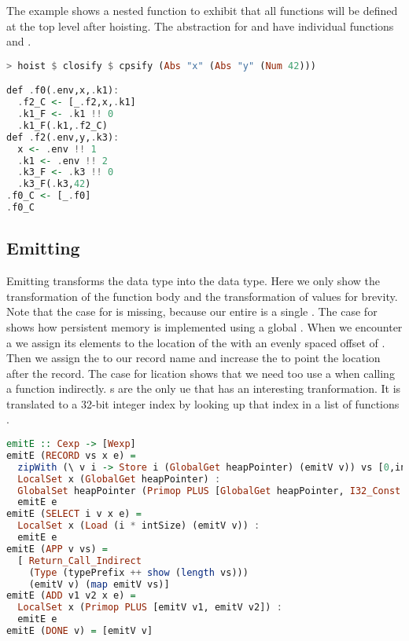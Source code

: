 {The example shows a nested function to exhibit that all functions will be defined at the top level after hoisting. The abstraction for  and  have individual functions  and .

\begin{lstlisting}[language=Haskell]
> hoist $ closify $ cpsify (Abs "x" (Abs "y" (Num 42)))

def .f0(.env,x,.k1):
  .f2_C <- [_.f2,x,.k1]
  .k1_F <- .k1 !! 0
  .k1_F(.k1,.f2_C)
def .f2(.env,y,.k3):
  x <- .env !! 1
  .k1 <- .env !! 2
  .k3_F <- .k3 !! 0
  .k3_F(.k3,42)
.f0_C <- [_.f0]
.f0_C
\end{lstlisting}

\subsection{\label{section:emit}Emitting}
Emitting transforms the  data type into the  data type. Here we only show the transformation of the function body  and the transformation of values  for brevity. Note that the case for  is missing, because our entire  is a single . The case for  shows how persistent memory is implemented using a global . When we encounter a  we assign its elements  to the location of the  with an evenly spaced offset of . Then we assign the  to our record name and increase the  to point the location after the record. The case for lication shows that we need too use a  when calling a function indirectly. s are the only ue that has an interesting tranformation. It is translated to a 32-bit integer index by looking up that index in a list of functions .

\begin{lstlisting}[language=Haskell]
emitE :: Cexp -> [Wexp]
emitE (RECORD vs x e) =
  zipWith (\ v i -> Store i (GlobalGet heapPointer) (emitV v)) vs [0,intSize..] ++
  LocalSet x (GlobalGet heapPointer) :
  GlobalSet heapPointer (Primop PLUS [GlobalGet heapPointer, I32_Const (length vs * intSize)]) :
  emitE e
emitE (SELECT i v x e) =
  LocalSet x (Load (i * intSize) (emitV v)) :
  emitE e
emitE (APP v vs) =
  [ Return_Call_Indirect
    (Type (typePrefix ++ show (length vs)))
    (emitV v) (map emitV vs)]
emitE (ADD v1 v2 x e) =
  LocalSet x (Primop PLUS [emitV v1, emitV v2]) :
  emitE e
emitE (DONE v) = [emitV v]


\end{lstlisting}}
